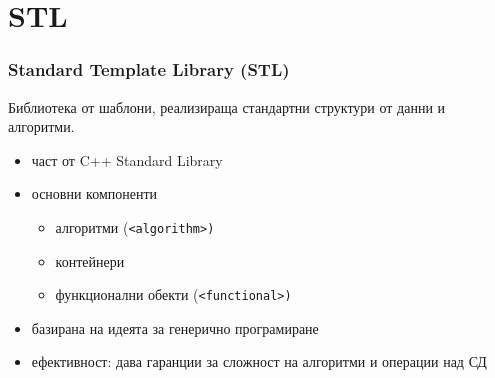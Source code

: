 \documentclass{beamer}
\begin{document}
\section{STL}

\begin{frame}
  \frametitle{Standard Template Library (STL)}

  Библиотека от шаблони, реализираща стандартни структури от данни и алгоритми.

  \begin{itemize}
  \item част от C++ Standard Library
  \item основни компоненти
    \begin{itemize}
    \item алгоритми (\tt{<algorithm>})
    \item контейнери
    \item функционални обекти (\tt{<functional>})
    \end{itemize}
  \item базирана на идеята за генерично програмиране
  \item ефективност: дава гаранции за сложност на алгоритми и операции над СД
  \end{itemize}
\end{frame}
\end{document}
